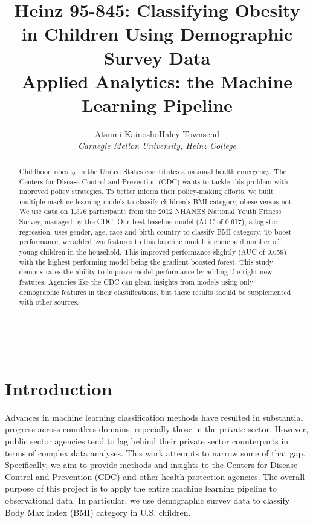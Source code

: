 \documentclass[twoside,11pt]{article}
\begin{document}
\title{Heinz 95-845: Classifying Obesity in Children Using Demographic Survey Data \\ Applied Analytics: the Machine Learning Pipeline}

\author{Atsumi Kainosho\qquad Haley Townsend\\
\em Carnegie Mellon University, Heinz College}\

\maketitle
\vspace{1em}
\begin{abstract}
   Childhood obesity in the United States constitutes a national health emergency. The Centers for Disease Control and Prevention (CDC) wants to tackle this problem with improved policy strategies. To better inform their policy-making efforts, we built multiple machine learning models to classify children's BMI category, obese versus not. We use data on 1,576 participants from the 2012 NHANES National Youth Fitness Survey, managed by the CDC. Our best baseline model (AUC of 0.617), a logistic regression, uses gender, age, race and birth country to classify BMI category. To boost performance, we added two features to this baseline model: income and number of young children in the household. This improved performance slightly (AUC of 0.659) with the highest performing model being the gradient boosted forest. This study demonstrates the ability to improve model performance by adding the right new features. Agencies like the CDC can glean insights from models using only demographic features in their classifications, but these results should be supplemented with other sources.
 
\end{abstract}


\section{Introduction}\label{intro}
Advances in machine learning classification methods have resulted in substantial progress across countless domains, especially those in the private sector. However, public sector agencies tend to lag behind their private sector counterparts in terms of complex data analyses. This work attempts to narrow some of that gap. Specifically, we aim to provide methods and insights to the Centers for Disease Control and Prevention (CDC) and other health protection agencies. The overall purpose of this project is to apply the entire machine learning pipeline to observational data. In particular, we use demographic survey data to classify Body Max Index (BMI) category in U.S. children. 
\end{document}
